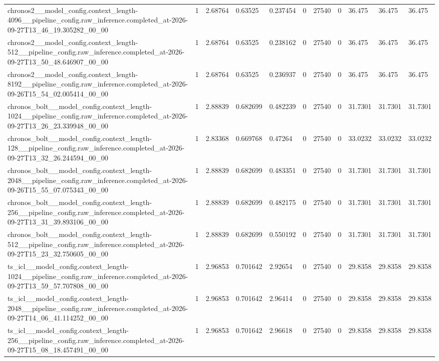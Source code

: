 \begin{tabular}{lllllllllll}
chronos2\_\_model\_config.context\_length-4096\_\_pipeline\_config.raw\_inference.completed\_at-2026-09-27T13\_46\_19.305282\_00\_00 & 1 & 2.68764 & 0.63525 & 0.237454 & 0 & 27540 & 0 & 36.475 & 36.475 & 36.475 \\
chronos2\_\_model\_config.context\_length-512\_\_pipeline\_config.raw\_inference.completed\_at-2026-09-27T13\_50\_48.646907\_00\_00 & 1 & 2.68764 & 0.63525 & 0.238162 & 0 & 27540 & 0 & 36.475 & 36.475 & 36.475 \\
chronos2\_\_model\_config.context\_length-8192\_\_pipeline\_config.raw\_inference.completed\_at-2026-09-26T15\_54\_02.005414\_00\_00 & 1 & 2.68764 & 0.63525 & 0.236937 & 0 & 27540 & 0 & 36.475 & 36.475 & 36.475 \\
chronos\_bolt\_\_model\_config.context\_length-1024\_\_pipeline\_config.raw\_inference.completed\_at-2026-09-27T13\_26\_23.339948\_00\_00 & 1 & 2.88839 & 0.682699 & 0.482239 & 0 & 27540 & 0 & 31.7301 & 31.7301 & 31.7301 \\
chronos\_bolt\_\_model\_config.context\_length-128\_\_pipeline\_config.raw\_inference.completed\_at-2026-09-27T13\_32\_26.244594\_00\_00 & 1 & 2.83368 & 0.669768 & 0.47264 & 0 & 27540 & 0 & 33.0232 & 33.0232 & 33.0232 \\
chronos\_bolt\_\_model\_config.context\_length-2048\_\_pipeline\_config.raw\_inference.completed\_at-2026-09-26T15\_55\_07.075343\_00\_00 & 1 & 2.88839 & 0.682699 & 0.483351 & 0 & 27540 & 0 & 31.7301 & 31.7301 & 31.7301 \\
chronos\_bolt\_\_model\_config.context\_length-256\_\_pipeline\_config.raw\_inference.completed\_at-2026-09-27T13\_31\_39.893106\_00\_00 & 1 & 2.88839 & 0.682699 & 0.482175 & 0 & 27540 & 0 & 31.7301 & 31.7301 & 31.7301 \\
chronos\_bolt\_\_model\_config.context\_length-512\_\_pipeline\_config.raw\_inference.completed\_at-2026-09-27T15\_23\_32.750605\_00\_00 & 1 & 2.88839 & 0.682699 & 0.550192 & 0 & 27540 & 0 & 31.7301 & 31.7301 & 31.7301 \\
ts\_icl\_\_model\_config.context\_length-1024\_\_pipeline\_config.raw\_inference.completed\_at-2026-09-27T13\_59\_57.707808\_00\_00 & 1 & 2.96853 & 0.701642 & 2.92654 & 0 & 27540 & 0 & 29.8358 & 29.8358 & 29.8358 \\
ts\_icl\_\_model\_config.context\_length-2048\_\_pipeline\_config.raw\_inference.completed\_at-2026-09-27T14\_06\_41.114252\_00\_00 & 1 & 2.96853 & 0.701642 & 2.96414 & 0 & 27540 & 0 & 29.8358 & 29.8358 & 29.8358 \\
ts\_icl\_\_model\_config.context\_length-256\_\_pipeline\_config.raw\_inference.completed\_at-2026-09-27T15\_08\_18.457491\_00\_00 & 1 & 2.96853 & 0.701642 & 2.96618 & 0 & 27540 & 0 & 29.8358 & 29.8358 & 29.8358 \\

\end{tabular}
